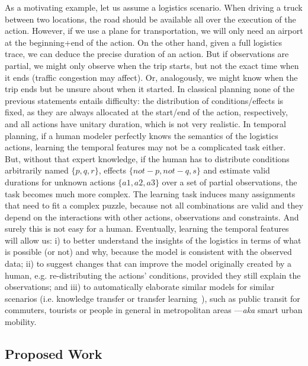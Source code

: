 \documentclass[10pt,journal,compsoc]{IEEEtran}
\begin{document}
As a motivating example, let us assume a logistics scenario. When driving a truck between two locations, the road should be available all over the execution of the action. However, if we use a plane for transportation, we will only need an airport at the beginning+end of the action.
On the other hand, given a full logistics trace, we can deduce the precise duration of an action. But if observations are partial, we might only observe when the trip starts, but not the exact time when it ends (traffic congestion may affect). Or, analogously, we might know when the trip ends but be unsure about when it started. 
In classical planning none of the previous statements entails difficulty: the distribution of conditions/effects is fixed, as they are always allocated at the start/end of the action, respectively, and all actions have unitary duration, which is not very realistic.
In temporal planning, if a human modeler perfectly knows the semantics of the logistics actions, learning the temporal features may not be a complicated task either. But, without that expert knowledge, if the human has to distribute conditions arbitrarily named $\{p, q, r\}$, effects $\{not-p, not-q, s\}$ and estimate valid durations for unknown actions $\{a1, a2, a3\}$ over a set of partial observations, the task becomes much more complex. The learning task induces many assignments that need to fit a complex puzzle, because not all combinations are valid and they depend on the interactions with other actions, observations and constraints. And surely this is not easy for a human. 
Eventually, learning the temporal features will allow us: i) to better understand the insights of the logistics in terms of what is possible (or not) and why, because the model is consistent with the observed data; ii) to suggest changes that can improve the model originally created by a human, e.g. re-distributing the actions' conditions, provided they still explain the observations; and iii) to automatically elaborate similar models for similar scenarios (i.e. knowledge transfer or transfer learning~\cite{Jialin2010}), such as public transit for commuters, tourists or people in general in metropolitan areas ---\textit{aka} smart urban mobility.


\subsection{Proposed Work}
\end{document}
